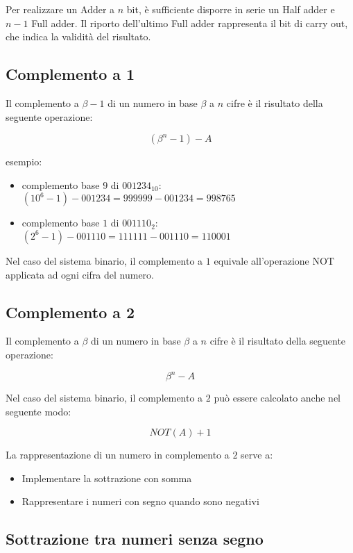 \documentclass{subfiles}
\begin{document}
\noindent
Per realizzare un Adder a $n$ bit, è sufficiente disporre in serie un Half adder e $n-1$ Full adder.
Il riporto dell'ultimo Full adder rappresenta il bit di carry out, che indica la validità del risultato.

\subsection{Complemento a 1}

Il complemento a $\beta - 1$ di un numero in base $\beta$ a $n$ cifre è il risultato della seguente operazione:

$$
(\beta^n - 1) - A
$$

\noindent
esempio:

\begin{itemize}
\item complemento base $9$ di $001234_{10}$: $(10^6 - 1) - 001234 = 999999 - 001234 = 998765$
\item complemento base $1$ di $001110_2$: $(2^6 - 1) - 001110 = 111111 - 001110 = 110001$
\end{itemize}

\noindent
Nel caso del sistema binario, il complemento a $1$ equivale all'operazione NOT applicata ad ogni cifra del numero.

\subsection{Complemento a 2}

Il complemento a $\beta$ di un numero in base $\beta$ a $n$ cifre è il risultato della seguente operazione:

$$
\beta^n - A
$$

\noindent
Nel caso del sistema binario, il complemento a $2$ può essere calcolato anche nel seguente modo:

$$
NOT(A) + 1
$$

\noindent
La rappresentazione di un numero in complemento a $2$ serve a:

\begin{itemize}
\item Implementare la sottrazione con somma
\item Rappresentare i numeri con segno quando sono negativi
\end{itemize}

\subsection{Sottrazione tra numeri senza segno}
\end{document}
